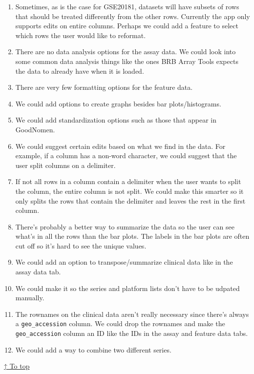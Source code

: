 \documentclass[]{article}
\providecommand{\tightlist}{%
  \setlength{\itemsep}{0pt}\setlength{\parskip}{0pt}}
\begin{document}
\begin{enumerate}
\def\labelenumi{\arabic{enumi}.}
\tightlist
\item
  Sometimes, as is the case for GSE20181, datasets will have subsets of
  rows that should be treated differently from the other rows. Currently
  the app only supports edits on entire columns. Perhaps we could add a
  feature to select which rows the user would like to reformat.
\item
  There are no data analysis options for the assay data. We could look
  into some common data analysis things like the ones BRB Array Tools
  expects the data to already have when it is loaded.
\item
  There are very few formatting options for the feature data.
\item
  We could add options to create graphs besides bar plots/histograms.
\item
  We could add standardization options such as those that appear in
  GoodNomen.
\item
  We could suggest certain edits based on what we find in the data. For
  example, if a column has a non-word character, we could suggest that
  the user split columns on a delimiter.
\item
  If not all rows in a column contain a delimiter when the user wants to
  split the column, the entire column is not split. We could make this
  smarter so it only splits the rows that contain the delimiter and
  leaves the rest in the first column.
\item
  There's probably a better way to summarize the data so the user can
  see what's in all the rows than the bar plots. The labels in the bar
  plots are often cut off so it's hard to see the unique values.
\item
  We could add an option to transpose/summarize clinical data like in
  the assay data tab.
\item
  We could make it so the series and platform lists don't have to be
  udpated manually.
\item
  The rownames on the clinical data aren't really necessary since
  there's always a \texttt{geo\_accession} column. We could drop the
  rownames and make the \texttt{geo\_accession} column an ID like the
  IDs in the assay and feature data tabs.
\item
  We could add a way to combine two different series.
\end{enumerate}

\protect\hyperlink{contents}{↑ To top}
\end{document}
